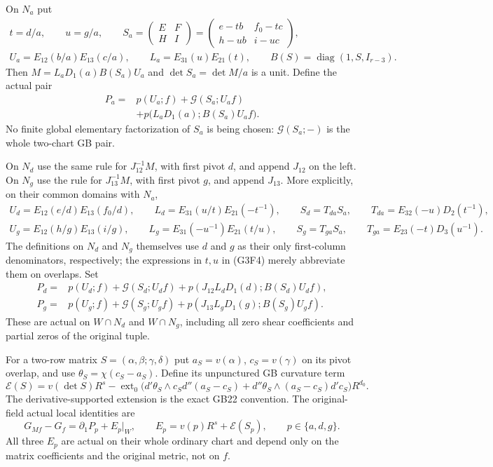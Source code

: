 On $N_a$ put
\[
 \begin{gathered}
 t=d/a,\qquad u=g/a,\qquad
 S_a=\begin{pmatrix}E&F\\H&I\end{pmatrix}
       =\begin{pmatrix}e-tb&f_0-tc\\h-ub&i-uc\end{pmatrix},\\
 U_a=E_{12}(b/a)E_{13}(c/a),\qquad
 L_a=E_{31}(u)E_{21}(t),\qquad
 B(S)=\operatorname{diag}(1,S,I_{r-3}).
 \end{gathered}
 \tag{G3F2}
\]
Then $M=L_aD_1(a)B(S_a)U_a$ and $\det S_a=\det M/a$ is a unit.
Define the actual pair
\[
 \begin{split}
 P_a={}&p(U_a;f)+\mathcal G(S_a;U_af)\\
       &+p\bigl(L_aD_1(a);B(S_a)U_af\bigr).
 \end{split}
 \tag{G3F3}
\]
No finite global elementary factorization of $S_a$ is being chosen:
$\mathcal G(S_a;-)$ is the whole two-chart GB pair.

On $N_d$ use the same rule for $J_{12}^{-1}M$, with first pivot $d$,
and append $J_{12}$ on the left.  On $N_g$ use the rule for
$J_{13}^{-1}M$, with first pivot $g$, and append $J_{13}$.
More explicitly, on their common domains with $N_a$,
\[
 \begin{gathered}
 U_d=E_{12}(e/d)E_{13}(f_0/d),\qquad
 L_d=E_{31}(u/t)E_{21}(-t^{-1}),\qquad
 S_d=T_{da}S_a,\qquad T_{da}=E_{32}(-u)D_2(t^{-1}),\\
 U_g=E_{12}(h/g)E_{13}(i/g),\qquad
 L_g=E_{31}(-u^{-1})E_{21}(t/u),\qquad
 S_g=T_{ga}S_a,\qquad T_{ga}=E_{23}(-t)D_3(u^{-1}).
 \end{gathered}
 \tag{G3F4}
\]
The definitions on $N_d$ and $N_g$ themselves use $d$ and $g$ as
their only first-column denominators, respectively; the expressions
in $t,u$ in (G3F4) merely abbreviate them on overlaps.  Set
\[
 \begin{split}
 P_d={}&p(U_d;f)+\mathcal G(S_d;U_df)
          +p(J_{12}L_dD_1(d);B(S_d)U_df),\\
 P_g={}&p(U_g;f)+\mathcal G(S_g;U_gf)
          +p(J_{13}L_gD_1(g);B(S_g)U_gf).
 \end{split}
 \tag{G3F5}
\]
These are actual on $W\cap N_d$ and $W\cap N_g$, including all
zero shear coefficients and partial zeros of the original tuple.

For a two-row matrix $S=(\alpha,\beta;\gamma,\delta)$ put
$a_S=v(\alpha)$, $c_S=v(\gamma)$ on its pivot overlap, and use
$\theta_S=\chi(c_S-a_S)$.  Define its unpunctured GB curvature term
\[
 \mathcal E(S)=v(\det S)R^s
   -\operatorname{ext}_0\bigl(
       d'\theta_S\wedge c_Sd''(a_S-c_S)
       +d''\theta_S\wedge(a_S-c_S)d'c_S\bigr)R^{d_0}.
 \tag{G3F6}
\]
The derivative-supported extension is the exact GB22 convention.
The original-field actual local identities are
\[
 G_{Mf}-G_f=\partial_1P_p+E_p|_W,\qquad
 E_p=v(p)R^s+\mathcal E(S_p),\qquad p\in\{a,d,g\}.
 \tag{G3F7}
\]
All three $E_p$ are actual on their whole ordinary chart and depend
only on the matrix coefficients and the original metric, not on $f$.

